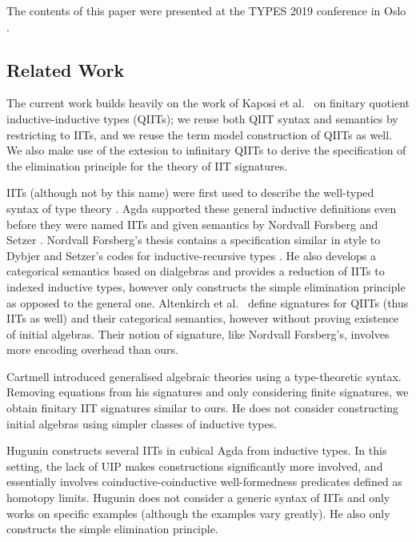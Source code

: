 \documentclass[a4paper,UKenglish,cleveref, autoref]{lipics-v2019}
\begin{document}
The contents of this paper were presented at the TYPES 2019 conference
in Oslo \cite{types}.

\subsection{Related Work}
\label{sec:related}

The current work builds heavily on the work of Kaposi et al.\
\cite{Kaposi:2019:CQI:3302515.3290315} on finitary quotient
inductive-inductive types (QIITs); we reuse both QIIT syntax and
semantics by restricting to IITs, and we reuse the term model
construction of QIITs as well. We also make use of the extesion to
infinitary QIITs \cite{large_inf_qiit} to derive the specification of
the elimination principle for the theory of IIT signatures.

IITs (although not by this name) were first used to describe the
well-typed syntax of type theory \cite{nisse,chapman09eatitself}. Agda
supported these general inductive definitions even before they were
named IITs and given semantics by Nordvall Forsberg and Setzer
\cite{nordvallforsbergSetzer2010inductiveinductive}. Nordvall
Forsberg's thesis \cite{forsberg-phd} contains a specification similar
in style to Dybjer and Setzer's codes for inductive-recursive types
\cite{Dybjer99afinite}. He also develops a categorical semantics based
on dialgebras and provides a reduction of IITs to indexed inductive
types, however only constructs the simple elimination principle as
opposed to the general one. Altenkirch et al.\ \cite{gabe} define
signatures for QIITs (thus IITs as well) and their categorical
semantics, however without proving existence of initial
algebras. Their notion of signature, like Nordvall Forsberg's,
involves more encoding overhead than ours.

Cartmell \cite{gat} introduced generalised algebraic theories using a
type-theoretic syntax. Removing equations from his signatures and only
considering finite signatures, we obtain finitary IIT signatures similar to
ours. He does not consider constructing initial algebras using simpler classes
of inductive types.

Hugunin \cite{jasper} constructs several IITs in cubical Agda from
inductive types. In this setting, the lack of UIP makes constructions
significantly more involved, and essentially involves
coinductive-coinductive well-formedness predicates defined as homotopy
limits. Hugunin does not consider a generic syntax of IITs and only
works on specific examples (although the examples vary greatly). He
also only constructs the simple elimination principle.
\end{document}
